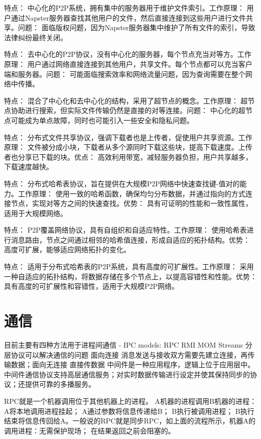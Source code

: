 \documentclass[twoside]{ctexart}
\begin{document}
\begin{multicols}{2}
  特点： 中心化的P2P系统，拥有集中的服务器用于维护文件索引。工作原理： 用户通过Napster服务器查找其他用户的文件，然后直接连接到这些用户进行文件共享。问题： 面临版权问题，因为Napster服务器集中维护了所有文件的索引，导致法律纠纷最终关闭。
  
  特点： 去中心化的P2P协议，没有中心化的服务器，每个节点充当对等方。工作原理： 用户通过网络直接连接到其他用户，共享文件。每个节点都可以充当客户端和服务器。问题： 可能面临搜索效率和网络流量问题，因为查询需要在整个网络中传播。

  特点： 混合了中心化和去中心化的结构，采用了超节点的概念。工作原理： 超节点协助进行搜索，但实际文件传输仍然是直接的对等连接。问题： 中心化的超节点可能成为单点故障，同时也可能引入一些安全和隐私问题。

  特点： 分布式文件共享协议，强调下载者也是上传者，促使用户共享资源。工作原理： 文件被分成小块，下载者从多个源同时下载这些块，提高下载速度。上传者也分享已下载的块。优点： 高效利用带宽，减轻服务器负担，用户共享越多，下载速度越快。

  
  特点： 分布式哈希表协议，旨在提供在大规模P2P网络中快速查找键-值对的能力。工作原理： 使用一致的哈希函数，确保均匀分布数据，并通过指向的方式连接节点，实现对等方之间的快速查找。优势： 具有可证明的性能和一致性属性，适用于大规模网络。

  特点： P2P覆盖网络协议，具有自组织和自适应特性。工作原理： 使用哈希表进行消息路由，节点之间通过相邻的哈希值连接，形成自适应的拓扑结构。优势： 高度可扩展，能够适应网络拓扑的变化。

  特点： 适用于分布式哈希表的P2P系统，具有高度的可扩展性。工作原理： 采用一种自适应的拓扑结构，将数据存储在多个节点上，以提高容错性和性能。优势： 具有高度的可扩展性和容错性，适用于大规模P2P网络。

  \section{通信} 目前主要有四种方法用于进程间通信 - IPC models: RPC RMI MOM Streams  分层协议可以解决通信的问题  面向连接 消息发送与接收双方需要先建立连接，再传输数据；面向无连接 直接传数据  中间件是一种应用程序，逻辑上位于应用层中。中间件通信协议支持高层通信服务；对实时数据传输进行设定并使其保持同步的协议；还提供可靠的多播服务。

   RPC就是一个机器调用位于其他机器上的进程。 A机器的进程调用B机器的进程：A将本地调用进程挂起； A通过参数将信息传递给B； B执行被调用进程； B执行结束将信息传回给A。一般说的RPC就是同步RPC，如上面的流程所示，机器A的调用进程：无需保护现场； 在结果返回之前会阻塞的。


\end{multicols}
\end{document}
